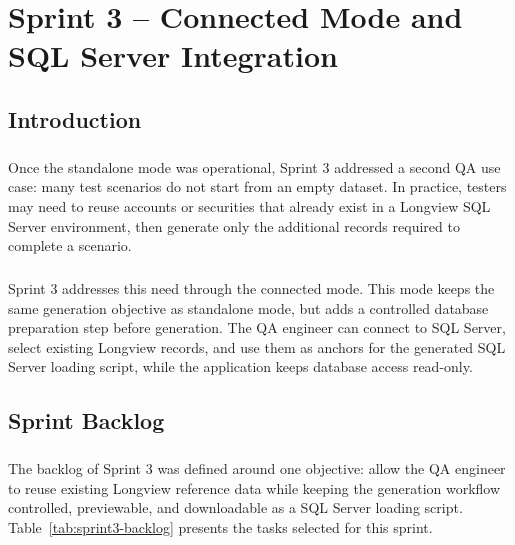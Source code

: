 \chapter{Sprint 3 -- Connected Mode and SQL Server Integration}

\setlength{\textfloatsep}{8pt plus 2pt minus 2pt}
\setlength{\floatsep}{8pt plus 2pt minus 2pt}
\setlength{\intextsep}{8pt plus 2pt minus 2pt}
\setlength{\abovecaptionskip}{4pt}
\setlength{\belowcaptionskip}{0pt}

\section*{Introduction}

\paragraph{}Once the standalone mode was operational, Sprint 3 addressed a second QA use case: many
test scenarios do not start from an empty dataset. In practice, testers may need to reuse accounts
or securities that already exist in a Longview SQL Server environment, then generate only the
additional records required to complete a scenario.

\paragraph{}Sprint 3 addresses this need through the connected mode. This mode keeps the same generation objective as standalone mode,
but adds a controlled database preparation step before generation. The QA engineer can connect to
SQL Server, select existing Longview records, and use them as anchors for the generated SQL Server
loading script, while the application keeps database access read-only.

\section{Sprint Backlog}

\paragraph{}The backlog of Sprint 3 was defined around one objective: allow the QA engineer to reuse
existing Longview reference data while keeping the generation workflow controlled, previewable, and
downloadable as a SQL Server loading script. Table~\ref{tab:sprint3-backlog} presents the tasks
selected for this sprint.

